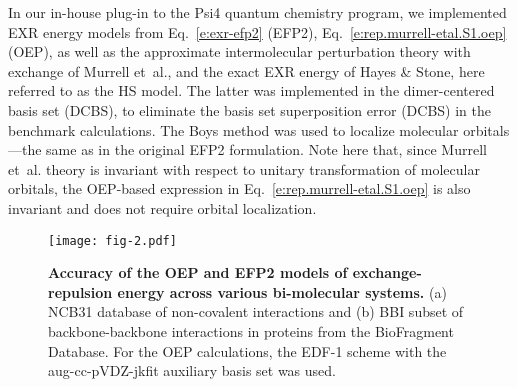 In our in\hyp{}house plug-in to the {\sc Psi4}
quantum chemistry
program,\cite{Psi4.JCTC.2017}
we implemented EXR energy models from Eq.~\eqref{e:exr-efp2}
(EFP2), Eq.~\eqref{e:rep.murrell-etal.S1.oep} (OEP), as well as 
the approximate intermolecular perturbation theory with exchange of 
Murrell et~al.\cite{Murrell.Randic.Williams.Longuet-Higgins.ProcRSocLondA.1965},
and the exact EXR energy of Hayes \& Stone\cite{Hayes.Stone.MolPhys.1984},
here referred to as the HS model.
The latter was
implemented in the dimer\hyp{}centered basis set\cite{Chalasinski.Gutowski.MolPhys.1985} (DCBS),
to eliminate the basis set
superposition error (DCBS) in the benchmark calculations.
The Boys method\cite{Boys.RevModPhys.1960} was used to localize
molecular orbitals---the same as in the original EFP2 formulation.
Note here that, since
Murrell et~al. theory is invariant with respect to unitary transformation
of molecular orbitals, the OEP\hyp{}based expression 
in Eq.~\eqref{e:rep.murrell-etal.S1.oep} is also invariant and does not require
orbital localization. 
%
%
%
\begin{figure*}[t]
\texttt{[image: fig-2.pdf]}
\caption{\label{f:fig-2} {\bf Accuracy of the OEP and EFP2 models of exchange\hyp{}repulsion energy
across various bi\hyp{}molecular systems.} 
(a) NCB31 
database\cite{Zhao.Schultz.Truhlar.JCTC.2006,
Zhao.Truhlar.JCTC.2005,Zhao.Schultz.Truhlar.JCTC.2006,Zhao.Schultz.Truhlar.JCP.2005} 
of non\hyp{}covalent interactions
and
(b) BBI subset\cite{Burns.Faver.Zheng.Marshall.Smith.Vanommeslaeghe.MacKerell.Merz.Sherrill.JCP.2017} 
of backbone\hyp{}backbone interactions in proteins from the BioFragment Database.
For the OEP calculations, the EDF-1 scheme with the aug-cc-pVDZ-jkfit auxiliary basis set
was used.
} 
\end{figure*}
%

